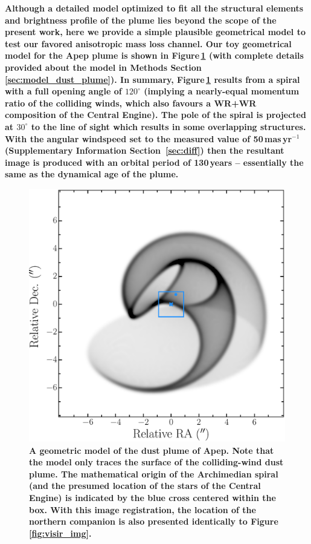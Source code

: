\documentclass[preprint,times]{aastex61}
\begin{document}
\textbf{Although a detailed model optimized to fit all the structural elements and brightness profile of the plume lies beyond the scope of the present work, here we provide a simple plausible geometrical model to test our favored anisotropic mass loss channel. Our toy geometrical model for the Apep plume is shown in Figure\,\ref{fig:model_dust_plume} (with complete details provided about the model in Methods Section\,\ref{sec:model_dust_plume}). In summary, Figure\,\ref{fig:model_dust_plume} results from a spiral with a full opening angle of $120^\circ$ (implying a nearly-equal momentum ratio of the colliding winds, which also favours a WR+WR composition of the Central Engine). The pole of the spiral is projected at $30^\circ$ to the line of sight which results in some overlapping structures. With the angular windspeed set to the measured value of 50\,mas\,yr$^{-1}$ (Supplementary Information Section~\ref{sec:diff}) then the resultant image is produced with an orbital period of 130\,years -- essentially the same as the dynamical age of the plume.}

\begin{figure}
\begin{center}
    \includegraphics[scale=0.5]{model_rel.eps}
    \caption{\textbf{A geometric model of the dust plume of Apep. Note that the model only traces the surface of the colliding-wind dust plume. The mathematical origin of the Archimedian spiral (and the presumed location of the stars of the Central Engine) is indicated by the blue cross centered within the box. With this image registration, the location of the northern companion is also presented identically to Figure\,\ref{fig:visir_img}.}}
    \label{fig:model_dust_plume}
\end{center}
\end{figure}
\end{document}
